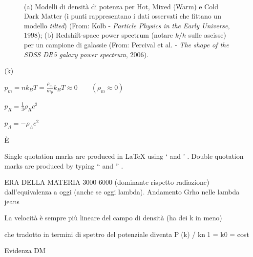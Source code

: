 \begin{figure}[H]
    $\;\;$
    \caption{(a) Modelli di densità di potenza per Hot, Mixed (Warm) e Cold Dark Matter (i punti rappresentano i dati osservati che fittano un modello \textit{tilted}) (From: Kolb - \textit{Particle Physics in the Early Universe}, 1998); (b) Redshift-space power spectrum (notare $k/h$ sulle ascisse) per un campione di galassie (From: Percival et al. - \textit{The shape of the SDSS DR5 galaxy power spectrum}, 2006).} \label{fig8:bella3} 
\end{figure}


\hslash
{}(k)

\begin{example}
$p_m=nk_B T = \frac{\rho_m}{m_p}k_B T \approx 0 \qquad ( \rho_m \approx 0) $
\end{example}
\begin{example}
$p_R=\frac{1}{3} \rho_R c^2 $
\end{example}
\begin{example}
$p_\Lambda= -\rho_\Lambda c^2 $
\end{example}



È

Single quotation marks are produced in LaTeX using ` and ' . Double quotation marks are produced by typing `` and '' .



ERA DELLA MATERIA 3000-6000 (dominante rispetto radiazione)  dall'equivalenza a oggi (anche se oggi lambda).
Andamento Grho nelle lambda jeans

La velocità è sempre più lineare del campo di densità (ha dei k in meno)


che tradotto in termini di spettro del potenziale diventa
P(k) / kn􀀀1 = k0 = cost


Evidenza DM